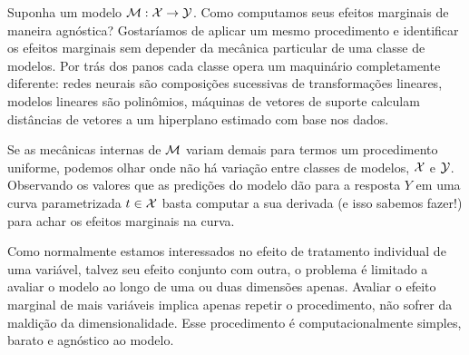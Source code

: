 Suponha um modelo $\mathcal{M} : \mathcal{X} \to \mathcal{Y}$. Como computamos seus efeitos marginais de maneira agnóstica? Gostaríamos de aplicar um mesmo procedimento e identificar os efeitos marginais sem depender da mecânica particular de uma classe de modelos. Por trás dos panos cada classe opera um maquinário completamente diferente: redes neurais são composições sucessivas de transformações lineares, modelos lineares são polinômios, máquinas de vetores de suporte calculam distâncias de vetores a um hiperplano estimado com base nos dados. 

Se as mecânicas internas de $\mathcal{M}$ variam demais para termos um procedimento uniforme, podemos olhar onde não há variação entre classes de modelos, $\mathcal{X}$ e $\mathcal{Y}$. Observando os valores que as predições do modelo dão para a resposta $Y$ em uma curva parametrizada $t \in \mathcal{X}$ basta computar a sua derivada (e isso sabemos fazer!) para achar os efeitos marginais na curva. 

Como normalmente estamos interessados no efeito de tratamento individual de uma variável, talvez seu efeito conjunto com outra, o problema é limitado a avaliar o modelo ao longo de uma ou duas dimensões apenas. Avaliar o efeito marginal de mais variáveis implica apenas repetir o procedimento, não sofrer da maldição da dimensionalidade. Esse procedimento é computacionalmente simples, barato e agnóstico ao modelo.
